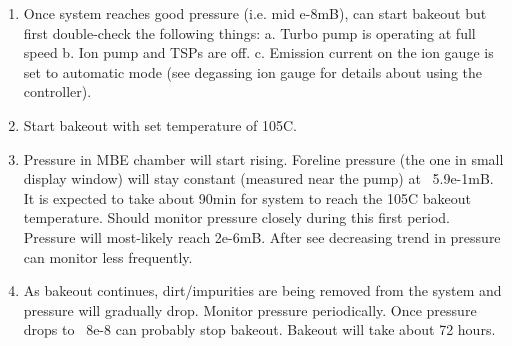 \begin{enumerate}
\item	Once system reaches good pressure (i.e. mid e-8mB), can start bakeout but first double-check the following things:
a.	Turbo pump is operating at full speed
b.	Ion pump and TSPs are off.
c.	Emission current on the ion gauge is set to automatic mode (see degassing ion gauge for details about using the controller).
\item	Start bakeout with set temperature of 105C. 
\item	Pressure in MBE chamber will start rising. Foreline pressure (the one in small display window) will stay constant (measured near the pump) at ~5.9e-1mB. It is expected to take about 90min for system to reach the 105C bakeout temperature. Should monitor pressure closely during this first period. Pressure will most-likely reach 2e-6mB. After see decreasing trend in pressure can monitor less frequently.
\item	As bakeout continues, dirt/impurities are being removed from the system and pressure will gradually drop. Monitor pressure periodically. Once pressure drops to ~8e-8 can probably stop bakeout. Bakeout will take about 72 hours.
\end{enumerate}

